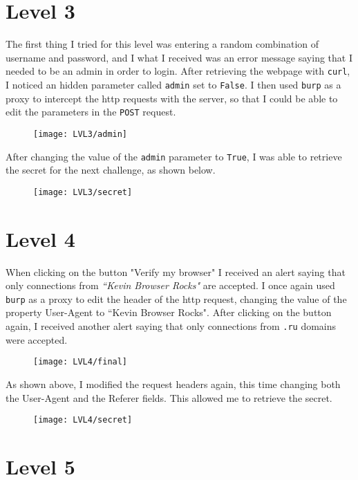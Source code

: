 \documentclass[12pt,a4paper]{article}
\begin{document}
	\section*{Level 3}
	The first thing I tried for this level was entering a random combination of username and password, and I what I received was an error message saying that I needed to be an admin in order to login. After retrieving the webpage with \texttt{curl}, I noticed an hidden parameter called \texttt{admin} set to \texttt{False}. I then used \texttt{burp} as a proxy to intercept the http requests with the server, so that I could be able to edit the parameters in the \texttt{POST} request.
	\begin{figure}[H]
		\centering
		\texttt{[image: LVL3/admin]}
		\label{fig:admin3}
	\end{figure}After changing the value of the \texttt{admin} parameter to \texttt{True}, I was able to retrieve the secret for the next challenge, as shown below.
	\begin{figure}[H]
		\centering
		\texttt{[image: LVL3/secret]}
		\label{fig:win3}
	\end{figure}	 

	\section*{Level 4}
	When clicking on the button "Verify my browser" I received an alert saying that only connections from \textit{``Kevin Browser Rocks"} are accepted. I once again used \texttt{burp} as a proxy to edit the header of the http request, changing the value of the property User-Agent to ``Kevin Browser Rocks". After clicking on the button again, I received another alert saying that only connections from \texttt{.ru} domains were accepted.\\
	\begin{figure}[H]
		\centering
		\texttt{[image: LVL4/final]}
		\label{fig:russian4}
	\end{figure}
	As shown above, I modified the request headers again, this time changing both the User-Agent and the Referer fields. This allowed me to retrieve the secret.
	\begin{figure}[H]
		\centering
		\texttt{[image: LVL4/secret]}
		\label{fig:secret4}
	\end{figure}


	\section*{Level 5}
\end{document}
